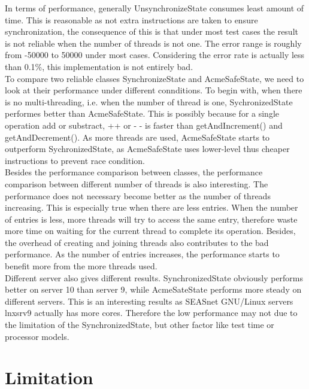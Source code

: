 \documentclass[letterpaper,twocolumn,10pt]{article}
\begin{document}
In terms of performance, generally  UnsynchronizeState consumes least amount of time. This is reasonable as not extra instructions are taken to ensure synchronization, the consequence of this is that under most test cases the result is not reliable when the number of threads is not one. The error range is roughly from -50000 to 50000 under most cases. Considering the error rate is actually less than 0.1\%, this implementation is not entirely bad.\\

To compare two reliable classes SynchronizeState and AcmeSafeState, we need to look at their performance under different connditions. To begin with, when there is no multi-threading, i.e. when the number of thread is one, SychronizedState performes better than AcmeSafeState. This is possibly because for a single operation add or substract, ++ or - - is faster than getAndIncrement() and getAndDecrement(). As more threads are used, AcmeSafeState starts to outperform SychronizedState, as AcmeSafeState uses lower-level thus cheaper instructions to prevent race condition.\\

Besides the performance comparison between classes, the performance comparison between different number of threads is also interesting. The performance does not necessary become better as the number of threads increasing. This is especially true when there are less entries. When the number of entries is less, more threads will try to access the same entry, therefore waste more time on waiting for the current thread to complete its operation. Besides, the overhead of creating and joining threads also contributes to the bad performance. As the number of entries increases, the performance starts to benefit more from the more threads used.\\


Different server also gives different results. SynchronizedState obviously performs better on server 10 than server 9, while AcmeSateState performs more steady on different servers. This is an interesting results as SEASnet GNU/Linux servers lnxsrv9 actually has more cores. Therefore the low performance may not due to the limitation of the SynchronizedState, but other factor like test time or processor models.\\

\section{Limitation}
\end{document}
